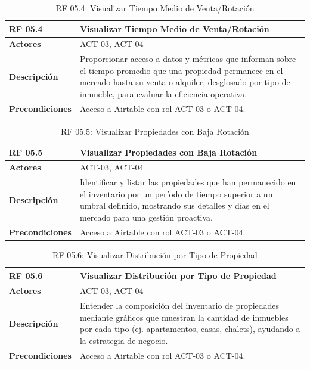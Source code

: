 \begin{table}[H]
\centering
\begin{tabular}{|p{3cm}|p{10cm}|}
\hline
\rowcolor{tealblue}
\textbf{RF 05.4} & \textbf{Visualizar Tiempo Medio de Venta/Rotación} \\
\hline
\textbf{Actores} & ACT-03, ACT-04 \\
\hline
\textbf{Descripción} & Proporcionar acceso a datos y métricas que informan sobre el tiempo promedio que una propiedad permanece en el mercado hasta su venta o alquiler, desglosado por tipo de inmueble, para evaluar la eficiencia operativa. \\
\hline
\textbf{Precondiciones} & Acceso a Airtable con rol ACT-03 o ACT-04. \\
\hline
\end{tabular}
\caption{RF 05.4: Visualizar Tiempo Medio de Venta/Rotación}
\label{tab:rf_airtable_5_4}
\end{table}

\begin{table}[H]
\centering
\begin{tabular}{|p{3cm}|p{10cm}|}
\hline
\rowcolor{tealblue}
\textbf{RF 05.5} & \textbf{Visualizar Propiedades con Baja Rotación} \\
\hline
\textbf{Actores} & ACT-03, ACT-04 \\
\hline
\textbf{Descripción} & Identificar y listar las propiedades que han permanecido en el inventario por un período de tiempo superior a un umbral definido, mostrando sus detalles y días en el mercado para una gestión proactiva. \\
\hline
\textbf{Precondiciones} & Acceso a Airtable con rol ACT-03 o ACT-04. \\
\hline
\end{tabular}
\caption{RF 05.5: Visualizar Propiedades con Baja Rotación}
\label{tab:rf_airtable_5_5}
\end{table}

\begin{table}[H]
\centering
\begin{tabular}{|p{3cm}|p{10cm}|}
\hline
\rowcolor{tealblue}
\textbf{RF 05.6} & \textbf{Visualizar Distribución por Tipo de Propiedad} \\
\hline
\textbf{Actores} & ACT-03, ACT-04 \\
\hline
\textbf{Descripción} & Entender la composición del inventario de propiedades mediante gráficos que muestran la cantidad de inmuebles por cada tipo (ej. apartamentos, casas, chalets), ayudando a la estrategia de negocio. \\
\hline
\textbf{Precondiciones} & Acceso a Airtable con rol ACT-03 o ACT-04. \\
\hline
\end{tabular}
\caption{RF 05.6: Visualizar Distribución por Tipo de Propiedad}
\label{tab:rf_airtable_5_6}
\end{table}


